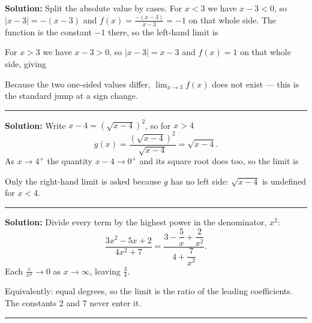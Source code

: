 \documentclass[12pt]{article}
\begin{document}



\textbf{Solution:} Split the absolute value by cases. For $x < 3$ we have
$x - 3 < 0$, so $|x-3| = -(x-3)$ and $f(x) = \frac{-(x-3)}{x-3} = -1$ on that
whole side. The function is the constant $-1$ there, so the left-hand limit is

For $x > 3$ we have $x - 3 > 0$, so $|x-3| = x-3$ and $f(x) = 1$ on that whole
side, giving 

Because the two one-sided values differ, $\lim_{x\to3} f(x)$ does not exist ---
this is the standard jump at a sign change.

\vspace{0.2cm}\noindent\rule{\linewidth}{0.2pt}\vspace{0.2cm}


\textbf{Solution:} Write $x - 4 = \left(\sqrt{x-4}\right)^2$, so for $x > 4$
\[
  g(x) = \frac{\left(\sqrt{x-4}\right)^2}{\sqrt{x-4}} = \sqrt{x-4}.
\]
As $x \to 4^+$ the quantity $x - 4 \to 0^+$ and its square root does too, so the
limit is 

Only the right-hand limit is asked because $g$ has no left side: $\sqrt{x-4}$ is
undefined for $x < 4$.

\vspace{0.2cm}\noindent\rule{\linewidth}{0.2pt}\vspace{0.2cm}


\textbf{Solution:} Divide every term by the highest power in the denominator,
$x^2$:
\[
  \frac{3x^2 - 5x + 2}{4x^2 + 7}
  = \frac{3 - \dfrac{5}{x} + \dfrac{2}{x^2}}{4 + \dfrac{7}{x^2}} .
\]
Each $\frac{c}{x^n} \to 0$ as $x \to \infty$, leaving $\frac{3}{4}$. 

Equivalently: equal degrees, so the limit is the ratio of the leading
coefficients. The constants $2$ and $7$ never enter it.

\vspace{0.2cm}\noindent\rule{\linewidth}{0.2pt}\vspace{0.2cm}

\end{document}
